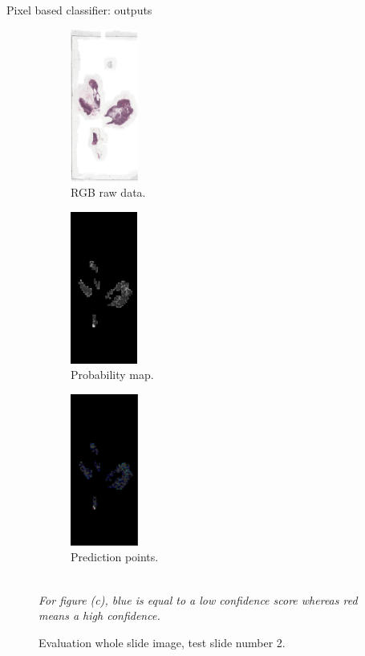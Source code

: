 \documentclass{beamer}
\begin{document}
\begin{frame}{Pixel based classifier: outputs}

\begin{small}
\begin{figure}[!ht]
\centering
\begin{subfigure}{.3\textwidth}
  \centering
  \includegraphics[width=\linewidth, height=5cm]{Test_002_whole.png}
  \caption{RGB raw data.}
  \label{RawImage}
\end{subfigure}%
\begin{subfigure}{.3\textwidth}
  \centering
  \includegraphics[width=\linewidth, height=5cm]{whole_probmap_Test_002.png}
  \caption{Probability map.}
  \label{ProbabilityMapLocalMaxima}
\end{subfigure}
\begin{subfigure}{.3\textwidth}
  \centering
  \includegraphics[width=\linewidth, height=5cm]{Detection.png}
  \caption{Prediction points.}
  \label{Detecting maxima}
\end{subfigure}
\\
\textit{For figure (c), blue is equal to a low confidence score whereas red means a high confidence.}
\caption{Evaluation whole slide image, test slide number 2.}

\label{fig:test}
\end{figure}
\end{small}
\end{frame}
\end{document}
